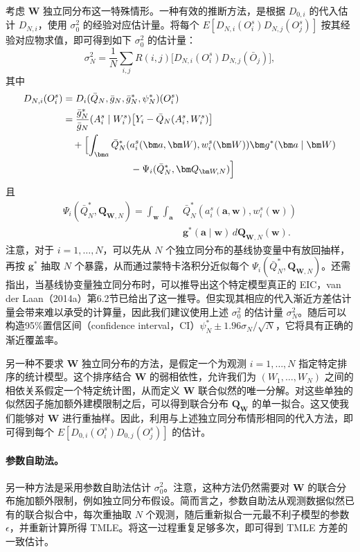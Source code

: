 考虑 $\bm W$ 独立同分布这一特殊情形。一种有效的推断方法，是根据 $D_{0,i}$ 的代入估计 $D_{N,i}$，使用 $\sigma_0^2$ 的经验对应估计量。将每个 $E[D_{N,i}(O_i^s)D_{N,j}(O_j^s)]$ 按其经验对应物求值，即可得到如下 $\sigma_0^2$ 的估计量：
\[
 \sigma_N^2=\frac{1}{N}\sum_{i,j}R(i,j)
 \bigl[D_{N,i}(O_i^s)D_{N,j}(\bar O_j)\bigr],
\]
其中
\[
 \begin{aligned}
 D_{N,i}(O_i^s)
 &=D_i(\bar Q_N,\bar g_N,\bar g_N^*,\psi_N^*)(O_i^s)\\
 &=\frac{\bar g_N^*}{\bar g_N}(A_i^s\mid W_i^s)
   \bigl[Y_i-\bar Q_N(A_i^s,W_i^s)\bigr]\\
 &\quad+\Bigl[\int_{\bm a}
 \bar Q_N^*(a_i^s(\bm a,\bm W),w_i^s(\bm W))
 \bm g^*(\bm a\mid\bm W)\\
 &\hspace{7em}{}-\Psi_i(\bar Q_N^*,\bm Q_{\bm W,N})\Bigr]
 \end{aligned}
\]
且
\[
 \begin{aligned}
 \Psi_i(\bar Q_N^*,\bm Q_{\bm W,N})
 =\int_{\bm w}\int_{\bm a}&
 \bar Q_N^*(a_i^s(\bm a,\bm w),w_i^s(\bm w))\\[-.2em]
 &\mathord{}\bm g^*(\bm a\mid\bm w)\,d\bm Q_{\bm W,N}(\bm w).
 \end{aligned}
\]
注意，对于 $i=1,\ldots,N$，可以先从 $N$ 个独立同分布的基线协变量中有放回抽样，再按 $\bm g^*$ 抽取 $N$ 个暴露，从而通过蒙特卡洛积分近似每个 $\Psi_i(\bar Q_N^*,\bm Q_{\bm W,N})$。还需指出，当基线协变量独立同分布时，可以推导出这个特定模型真正的 EIC，van der Laan（2014a）第6.2节已给出了这一推导。但实现其相应的代入渐近方差估计量会带来难以承受的计算量，因此我们建议使用上述 $\sigma_0^2$ 的估计量 $\sigma_N^2$。随后可以构造95\%置信区间（confidence interval，CI）$\psi_N^*\pm1.96\sigma_N/\sqrt N$，它将具有正确的渐近覆盖率。

另一种不要求 $\bm W$ 独立同分布的方法，是假定一个为观测 $i=1,\ldots,N$ 指定特定排序的统计模型。这个排序结合 $\bm W$ 的弱相依性，允许我们为 $(W_1,\ldots,W_N)$ 之间的相依关系假定一个特定统计图，从而定义 $\bm W$ 联合似然的唯一分解。对这些单独的似然因子施加额外建模限制之后，可以得到联合分布 $\bm Q_{\bm W}$ 的单一拟合。这又使我们能够对 $\bm W$ 进行重抽样。因此，利用与上述独立同分布情形相同的代入方法，即可得到每个 $E[D_{0,i}(O_i^s)D_{0,j}(O_j^s)]$ 的估计。

\paragraph{参数自助法。}
另一种方法是采用参数自助法估计 $\sigma_0^2$。注意，这种方法仍然需要对 $\bm W$ 的联合分布施加额外限制，例如独立同分布假设。简而言之，参数自助法从观测数据似然已有的联合拟合中，每次重抽取 $N$ 个观测，随后重新拟合一元最不利子模型的参数 $\epsilon$，并重新计算所得 TMLE。将这一过程重复足够多次，即可得到 TMLE 方差的一致估计。


